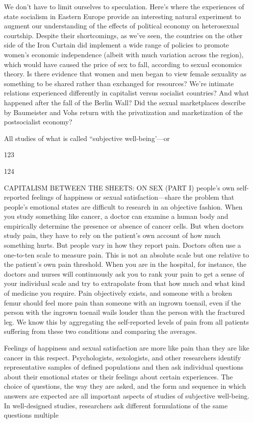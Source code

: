  \par 
We don’t have to limit ourselves to speculation. Here’s where the experiences of state socialism in Eastern Europe provide an interesting natural experiment to augment our understanding of the effects of political economy on heterosexual courtship. Despite their shortcomings, as we've seen, the countries on the other side of the Iron Curtain did implement a wide range of policies to promote women’s economic independence (albeit with much variation across the region), which would have caused the price of sex to fall, according to sexual economics theory. Is there evidence that women and men began to view female sexuality as something to be shared rather than exchanged for resources? We're intimate relations experienced differently in capitalist versus socialist countries? And what happened after the fall of the Berlin Wall? Did the sexual marketplaces describe by Baumeister and Vohs return with the privatization and marketization of the postsocialist economy?
 \par 
All studies of what is called “subjective well-being’—or
 \par 
123
 \par 
124
 \par 
CAPITALISM BETWEEN THE SHEETS: ON SEX (PART I) people’s own self-reported feelings of happiness or sexual satisfaction—share the problem that people’s emotional states are difficult to research in an objective fashion. When you study something like cancer, a doctor can examine a human body and empirically determine the presence or absence of cancer cells. But when doctors study pain, they have to rely on the patient’s own account of how much something hurts. But people vary in how they report pain. Doctors often use a one-to-ten scale to measure pain. This is not an absolute scale but one relative to the patient’s own pain threshold. When you are in the hospital, for instance, the doctors and nurses will continuously ask you to rank your pain to get a sense of your individual scale and try to extrapolate from that how much and what kind of medicine you require. Pain objectively exists, and someone with a broken femur should feel more pain than someone with an ingrown toenail, even if the person with the ingrown toenail wails louder than the person with the fractured leg. We know this by aggregating the self-reported levels of pain from all patients suffering from these two conditions and comparing the averages.
 \par 
Feelings of happiness and sexual satisfaction are more like pain than they are like cancer in this respect. Psychologists, sexologists, and other researchers identify representative samples of defined populations and then ask individual questions about their emotional states or their feelings about certain experiences. The choice of questions, the way they are asked, and the form and sequence in which answers are expected are all important aspects of studies of subjective well-being. In well-designed studies, researchers ask different formulations of the same questions multiple
